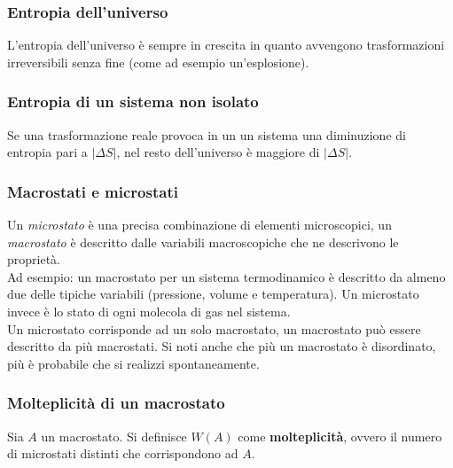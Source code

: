 \subsubsection{Entropia dell'universo}
L'entropia dell'universo è sempre in crescita in quanto avvengono trasformazioni irreversibili senza
fine (come ad esempio un'esplosione).

\subsubsection{Entropia di un sistema non isolato}
Se una trasformazione reale provoca in un un sistema una diminuzione di entropia pari a 
$\vert \Delta S \vert$, nel resto dell'universo è maggiore di $\vert \Delta S \vert$.

\subsubsection{Macrostati e microstati}
Un \emph{microstato} è una precisa combinazione di elementi microscopici, un \emph{macrostato} è 
descritto dalle variabili macroscopiche che ne descrivono le proprietà.\\
Ad esempio: un macrostato per un sistema termodinamico è descritto da almeno due delle tipiche 
variabili (pressione, volume e temperatura). Un microstato invece è lo stato di ogni molecola di gas 
nel sistema.\\
Un microstato corrisponde ad un solo macrostato, un macrostato può essere descritto da più macrostati.
Si noti anche che più un macrostato è disordinato, più è probabile che si realizzi spontaneamente.

\subsubsection{Molteplicità di un macrostato}
Sia $A$ un macrostato. Si definisce $W(A)$ come \textbf{molteplicità}, ovvero il numero di microstati 
distinti che corrispondono ad $A$.

\begin{center}
\end{center}

